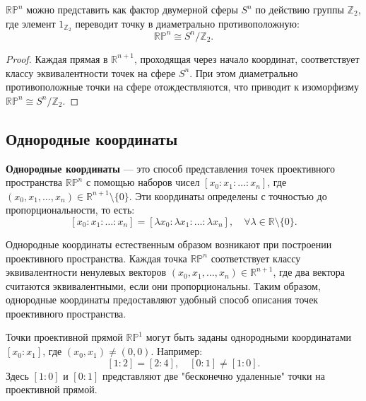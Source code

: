 \begin{theorem}
$ \mathbb{RP}^n $ можно представить как фактор двумерной сферы $ S^n $ по действию группы $ \mathbb{Z}_2 $, где элемент $ 1_{\mathbb{Z}_2} $ переводит точку в диаметрально противоположную:
\[
\mathbb{RP}^n \cong S^n / \mathbb{Z}_2.
\]
\end{theorem}

\begin{proof}
Каждая прямая в $ \mathbb{R}^{n+1} $, проходящая через начало координат, соответствует классу эквивалентности точек на сфере $ S^n $. При этом диаметрально противоположные точки на сфере отождествляются, что приводит к изоморфизму $ \mathbb{RP}^n \cong S^n / \mathbb{Z}_2 $.
\end{proof}

\subsection{Однородные координаты}

\begin{definition}
    \textbf{Однородные координаты} — это способ представления точек проективного пространства $ \mathbb{RP}^n $ с помощью наборов чисел $ [x_0 : x_1 : \dots : x_n] $, где $ (x_0, x_1, \dots, x_n) \in \mathbb{R}^{n+1} \setminus \{0\} $. Эти координаты определены с точностью до пропорциональности, то есть:
    \[
    [x_0 : x_1 : \dots : x_n] = [\lambda x_0 : \lambda x_1 : \dots : \lambda x_n], \quad \forall \lambda \in \mathbb{R} \setminus \{0\}.
    \]
    \end{definition}
    
    \begin{remark}
    Однородные координаты естественным образом возникают при построении проективного пространства. Каждая точка $ \mathbb{RP}^n $ соответствует классу эквивалентности ненулевых векторов $ (x_0, x_1, \dots, x_n) \in \mathbb{R}^{n+1} $, где два вектора считаются эквивалентными, если они пропорциональны. Таким образом, однородные координаты предоставляют удобный способ описания точек проективного пространства.
    \end{remark}
    
    \begin{example}
    Точки проективной прямой $ \mathbb{RP}^1 $ могут быть заданы однородными координатами $ [x_0 : x_1] $, где $ (x_0, x_1) \neq (0, 0) $. Например:
    \[
    [1 : 2] = [2 : 4], \quad [0 : 1] \neq [1 : 0].
    \]
    Здесь $ [1 : 0] $ и $ [0 : 1] $ представляют две "бесконечно удаленные" точки на проективной прямой.
    \end{example}
    
